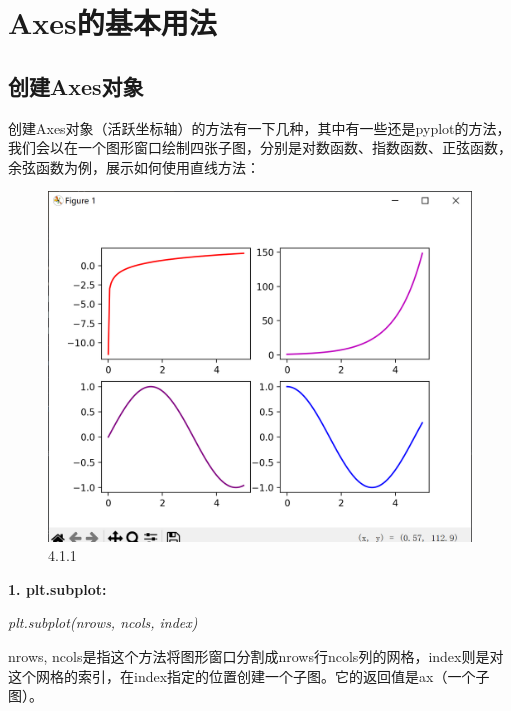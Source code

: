 \documentclass[12pt]{article}
\begin{document}
\section{Axes的基本用法}
\subsection{创建Axes对象}\label{创建Axes对象}
创建Axes对象（活跃坐标轴）的方法有一下几种，其中有一些还是pyplot的方法，我们会以在一个图形窗口绘制四张子图，分别是对数函数、指数函数、正弦函数，余弦函数为例，展示如何使用直线方法：
\begin{figure}[H]
    \centering
    \includegraphics[width=0.5\linewidth]{创建子图 Pic1.png}
    \caption{4.1.1}
    \label{fig:enter-label}
\end{figure}

\noindent\textbf{\large 1. plt.subplot:}

\textit{plt.subplot(nrows, ncols, index)}

nrows, ncols是指这个方法将图形窗口分割成nrows行ncols列的网格，index则是对这个网格的索引，在index指定的位置创建一个子图。它的返回值是ax（一个子图）。
\end{document}

